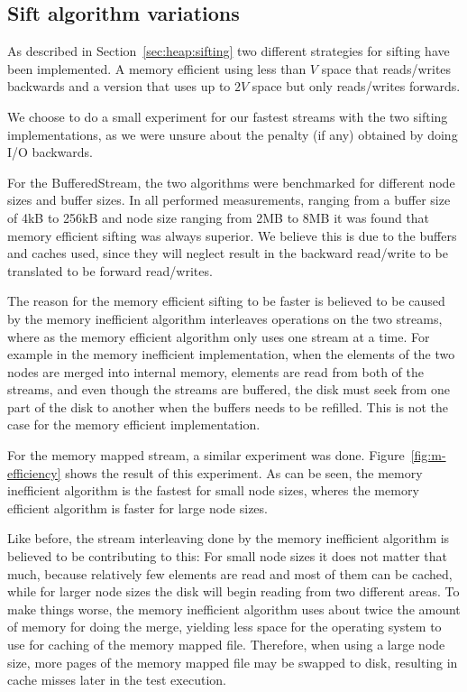 
\subsection{Sift algorithm variations}
As described in Section~\ref{sec:heap:sifting} two different strategies for sifting have been implemented. A memory efficient using less than $V$ space that reads/writes backwards and a version that uses up to $2V$ space but only reads/writes forwards.

We choose to do a small experiment for our fastest streams with the two sifting implementations, as we were unsure about the penalty (if any) obtained by doing I/O backwards.

For the BufferedStream, the two algorithms were benchmarked for different node sizes and buffer sizes. In all performed measurements, ranging from a buffer size of 4kB to 256kB and node size ranging from 2MB to 8MB it was found that memory efficient sifting was always superior. We believe this is due to the buffers and caches used, since they will neglect result in the backward read/write to be translated to be forward read/writes.

The reason for the memory efficient sifting to be faster is believed to be caused by the memory inefficient algorithm interleaves operations on the two streams, where as the memory efficient algorithm only uses one stream at a time. For example in the memory inefficient implementation, when the elements of the two nodes are merged into internal memory, elements are read from both of the streams, and even though the streams are buffered, the disk must seek from one part of the disk to another when the buffers needs to be refilled. This is not the case for the memory efficient implementation.

For the memory mapped stream, a similar experiment was done. Figure~\ref{fig:m-efficiency} shows the result of this experiment. As can be seen, the memory inefficient algorithm is the fastest for small node sizes, wheres the memory efficient algorithm is faster for large node sizes.

Like before, the stream interleaving done by the memory inefficient algorithm is believed to be contributing to this: For small node sizes it does not matter that much, because relatively few elements are read and most of them can be cached, while for larger node sizes the disk will begin reading from two different areas. To make things worse, the memory inefficient algorithm uses about twice the amount of memory for doing the merge, yielding less space for the operating system to use for caching of the memory mapped file. Therefore, when using a large node size, more pages of the memory mapped file may be swapped to disk, resulting in cache misses later in the test execution.


